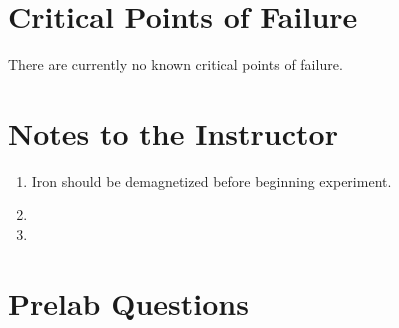 \section{Critical Points of Failure}
There are currently no known critical points of failure.


\section{Notes to the Instructor}
\begin{enumerate}
\item Iron should be demagnetized before beginning experiment.
\item 
\item 
\end{enumerate}


\section{Prelab Questions}
